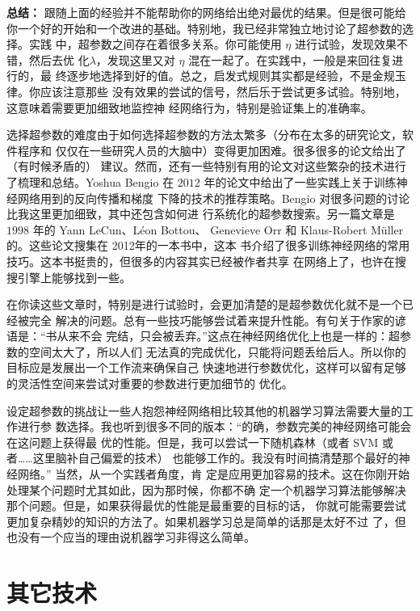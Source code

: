 \textbf{总结：} 跟随上面的经验并不能帮助你的网络给出绝对最优的结果。但是很可能给
你一个好的开始和一个改进的基础。特别地，我已经非常独立地讨论了超参数的选择。实践
中，超参数之间存在着很多关系。你可能使用 $\eta$ 进行试验，发现效果不错，然后去优
化$\lambda$，发现这里又对 $\eta$ 混在一起了。在实践中，一般是来回往复进行的，最
终逐步地选择到好的值。总之，启发式规则其实都是经验，不是金规玉律。你应该注意那些
没有效果的尝试的信号，然后乐于尝试更多试验。特别地，这意味着需要更加细致地监控神
经网络行为，特别是验证集上的准确率。

选择超参数的难度由于如何选择超参数的方法太繁多（分布在太多的研究论文，软件程序和
  仅仅在一些研究人员的大脑中）变得更加困难。很多很多的论文给出了（有时候矛盾的）
建议。然而，还有一些特别有用的论文对这些繁杂的技术进行了梳理和总结。Yoshua
Bengio 在 $2012$ 年的论文中给出了一些实践上关于训练神经网络用到的反向传播和梯度
下降的技术的推荐策略。Bengio 对很多问题的讨论比我这里更加细致，其中还包含如何进
行系统化的超参数搜索。另一篇文章是 $1998$ 年的 Yann LeCun、Léon Bottou、
Genevieve Orr 和 Klaus-Robert Müller 的。这些论文搜集在 2012年的一本书中，这本
书介绍了很多训练神经网络的常用技巧。这本书挺贵的，但很多的内容其实已经被作者共享
在网络上了，也许在搜搜引擎上能够找到一些。

在你读这些文章时，特别是进行试验时，会更加清楚的是超参数优化就不是一个已经被完全
解决的问题。总有一些技巧能够尝试着来提升性能。有句关于作家的谚语是：“书从来不会
完结，只会被丢弃。”这点在神经网络优化上也是一样的：超参数的空间太大了，所以人们
无法真的完成优化，只能将问题丢给后人。所以你的目标应是发展出一个工作流来确保自己
快速地进行参数优化，这样可以留有足够的灵活性空间来尝试对重要的参数进行更加细节的
优化。

设定超参数的挑战让一些人抱怨神经网络相比较其他的机器学习算法需要大量的工作进行参
数选择。我也听到很多不同的版本：“的确，参数完美的神经网络可能会在这问题上获得最
优的性能。但是，我可以尝试一下随机森林（或者 SVM 或者……这里脑补自己偏爱的技术）
也能够工作的。我没有时间搞清楚那个最好的神经网络。” 当然，从一个实践者角度，肯
定是应用更加容易的技术。这在你刚开始处理某个问题时尤其如此，因为那时候，你都不确
定一个机器学习算法能够解决那个问题。但是，如果获得最优的性能是最重要的目标的话，
你就可能需要尝试更加复杂精妙的知识的方法了。如果机器学习总是简单的话那是太好不过
了，但也没有一个应当的理由说机器学习非得这么简单。

\section{其它技术}
\label{sec:other_techniques}

